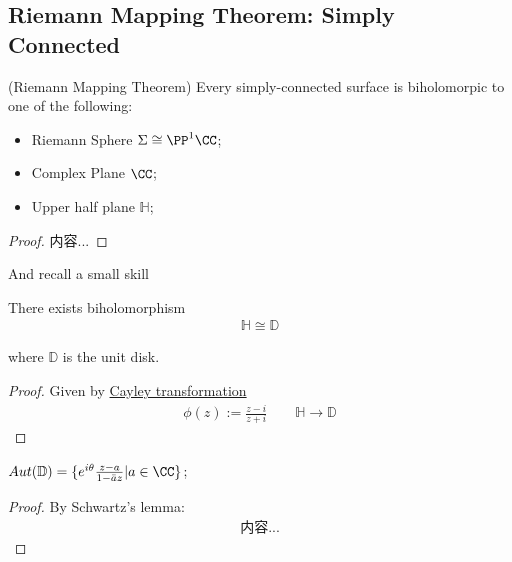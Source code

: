 \documentclass[Total.tex]{subfiles}
\begin{document}
			\subsection{Riemann Mapping Theorem: Simply Connected}
			\begin{theorem}
				(Riemann Mapping Theorem) Every simply-connected surface is biholomorpic to one of the following:
				\begin{itemize}
					\item Riemann Sphere $
					\Sigma \cong \PP^1\CC$;
					\item Complex Plane $\CC$;
					\item Upper half plane $\mathbb{H}$;
				\end{itemize}
			\end{theorem}
			\begin{proof}
				内容...
			\end{proof}
			
			And recall a small skill
			\begin{proposition}
				There exists biholomorphism
				\begin{gather*}
					\mathbb{H}\cong \mathbb{D}
				\end{gather*}
				
				where $\mathbb{D}$ is the unit disk. 
			\end{proposition}
			\begin{proof}
				Given by \underline{Cayley transformation}
				\begin{gather*}
					\phi(z):=\frac{z-i}{z+i}\qquad \mathbb{H}\rightarrow \mathbb{D}
				\end{gather*}
			\end{proof}
			
			\begin{lemma}
				$Aut(\mathbb{D})=\{e^{i\theta}\frac{z-a}{1-\bar{a}z}|a\in \CC\}$;
			\end{lemma}
			\begin{proof}
				By Schwartz's lemma:
				\begin{gather*}
					内容...
				\end{gather*}
			\end{proof}
			
\end{document}
